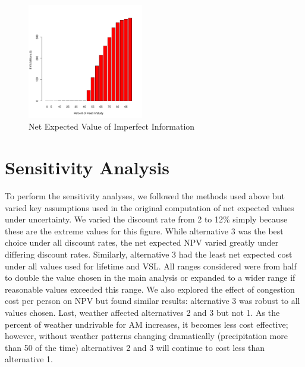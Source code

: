 \documentclass[11pt, letterpaper]{article}
\begin{document}
\begin{figure}[h]
\centering
\includegraphics[width=0.45\textwidth]{../../R/alt3Barplot.pdf}
\caption{Net Expected Value of Imperfect Information}
\label{fig:evii}
\end{figure}



\section{Sensitivity Analysis} \label{sensitivity}

To perform the sensitivity analyses, we followed the methods used
above but varied key assumptions used in the original computation of
net expected values under uncertainty.  We varied the discount rate
from 2 to 12\% simply because these are the extreme values for this
figure.  While alternative 3 was the best choice under all discount
rates, the net expected NPV varied greatly under differing discount
rates. Similarly, alternative 3 had the least net expected cost under
all values used for lifetime and VSL.  All ranges considered were from
half to double the value chosen in the main analysis or expanded to
a wider range if reasonable values exceeded this range.  We also
explored the effect of congestion cost per person on NPV but found
similar results: alternative 3 was robust to all values chosen.
Last, weather affected alternatives 2 and 3 but not 1.
As the percent of weather
undrivable for AM increases, it becomes less cost effective; however,
without  weather patterns changing dramatically (precipitation more
than 50 of the time) alternatives 2 and 3 will continue to cost less
than alternative 1.
\end{document}
